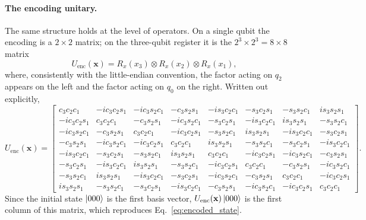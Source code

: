 \documentclass[12pt]{article}
\numberwithin{equation}{section}  %
\begin{document}
\paragraph{The encoding unitary.} The same structure holds at the level of operators. On a single qubit the encoding is a $2 \times 2$ matrix; on the three-qubit register it is the $2^3 \times 2^3 = 8 \times 8$ matrix
\begin{equation}
U_{\mathrm{enc}}(\mathbf{x}) = R_x(x_3) \otimes R_x(x_2) \otimes R_x(x_1),
\end{equation}
where, consistently with the little-endian convention, the factor acting on $q_2$ appears on the left and the factor acting on $q_0$ on the right. Written out explicitly,
{\setlength{\arraycolsep}{2.5pt}
\begin{equation}
U_{\mathrm{enc}}(\mathbf{x}) =
\begin{bmatrix}
c_3c_2c_1 & -ic_3c_2s_1 & -ic_3s_2c_1 & -c_3s_2s_1 & -is_3c_2c_1 & -s_3c_2s_1 & -s_3s_2c_1 & is_3s_2s_1\\
-ic_3c_2s_1 & c_3c_2c_1 & -c_3s_2s_1 & -ic_3s_2c_1 & -s_3c_2s_1 & -is_3c_2c_1 & is_3s_2s_1 & -s_3s_2c_1\\
-ic_3s_2c_1 & -c_3s_2s_1 & c_3c_2c_1 & -ic_3c_2s_1 & -s_3s_2c_1 & is_3s_2s_1 & -is_3c_2c_1 & -s_3c_2s_1\\
-c_3s_2s_1 & -ic_3s_2c_1 & -ic_3c_2s_1 & c_3c_2c_1 & is_3s_2s_1 & -s_3s_2c_1 & -s_3c_2s_1 & -is_3c_2c_1\\
-is_3c_2c_1 & -s_3c_2s_1 & -s_3s_2c_1 & is_3s_2s_1 & c_3c_2c_1 & -ic_3c_2s_1 & -ic_3s_2c_1 & -c_3s_2s_1\\
-s_3c_2s_1 & -is_3c_2c_1 & is_3s_2s_1 & -s_3s_2c_1 & -ic_3c_2s_1 & c_3c_2c_1 & -c_3s_2s_1 & -ic_3s_2c_1\\
-s_3s_2c_1 & is_3s_2s_1 & -is_3c_2c_1 & -s_3c_2s_1 & -ic_3s_2c_1 & -c_3s_2s_1 & c_3c_2c_1 & -ic_3c_2s_1\\
is_3s_2s_1 & -s_3s_2c_1 & -s_3c_2s_1 & -is_3c_2c_1 & -c_3s_2s_1 & -ic_3s_2c_1 & -ic_3c_2s_1 & c_3c_2c_1
\end{bmatrix}.
\label{eq:unitarymatrix}
\end{equation}
}
Since the initial state $\ket{000}$ is the first basis vector, $U_{\mathrm{enc}}(\mathbf{x})\ket{000}$ is the first column of this matrix, which reproduces Eq.~\eqref{eq:encoded_state}.
\end{document}
